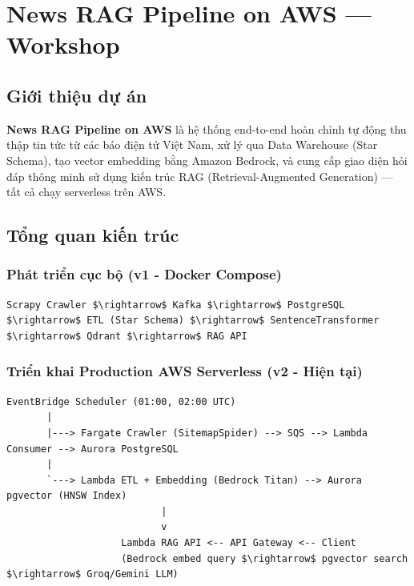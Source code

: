 \hypertarget{news-rag-pipeline-on-aws-workshop}{%
\section{News RAG Pipeline on AWS ---
Workshop}}

\hypertarget{giux1edbi-thiux1ec7u-dux1ef1-uxe1n}{%
\subsection{Giới thiệu dự án}}

\textbf{News RAG Pipeline on AWS} là hệ thống end-to-end hoàn chỉnh tự
động thu thập tin tức từ các báo điện tử Việt Nam, xử lý qua Data
Warehouse (Star Schema), tạo vector embedding bằng Amazon Bedrock, và
cung cấp giao diện hỏi đáp thông minh sử dụng kiến trúc RAG
(Retrieval-Augmented Generation) --- tất cả chạy serverless trên AWS.

\hypertarget{tux1ed5ng-quan-kiux1ebfn-truxfac}{%
\subsection{Tổng quan kiến
trúc}}

\hypertarget{phuxe1t-triux1ec3n-cux1ee5c-bux1ed9-v1---docker-compose}{%
\subsubsection{Phát triển cục bộ (v1 - Docker
Compose)}}

\begin{verbatim}
Scrapy Crawler $\rightarrow$ Kafka $\rightarrow$ PostgreSQL $\rightarrow$ ETL (Star Schema) $\rightarrow$ SentenceTransformer $\rightarrow$ Qdrant $\rightarrow$ RAG API
\end{verbatim}

\hypertarget{triux1ec3n-khai-production-aws-serverless-v2---hiux1ec7n-tux1ea1i}{%
\subsubsection{Triển khai Production AWS Serverless (v2 - Hiện
tại)}}

\begin{verbatim}
EventBridge Scheduler (01:00, 02:00 UTC)
       |
       |---> Fargate Crawler (SitemapSpider) --> SQS --> Lambda Consumer --> Aurora PostgreSQL
       |
       `---> Lambda ETL + Embedding (Bedrock Titan) --> Aurora pgvector (HNSW Index)
                           |
                           v
                    Lambda RAG API <-- API Gateway <-- Client
                    (Bedrock embed query $\rightarrow$ pgvector search $\rightarrow$ Groq/Gemini LLM)
\end{verbatim}

